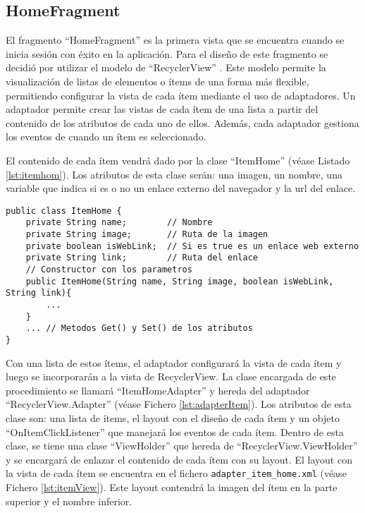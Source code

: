 \subsection{HomeFragment}

El fragmento ``HomeFragment'' es la primera vista que se encuentra cuando se inicia sesión con éxito en la aplicación. Para el diseño de este fragmento se decidió por utilizar el modelo de ``RecyclerView'' \cite{URL::recycler}. Este modelo permite la visualización de listas de elementos o ítems de una forma más flexible, permitiendo configurar la vista de cada ítem mediante el uso de adaptadores. Un adaptador permite crear las vistas de cada ítem de una lista a partir del contenido de los atributos de cada uno de ellos. Además, cada adaptador gestiona los eventos de cuando un ítem es seleccionado.

El contenido de cada ítem vendrá dado por la clase ``ItemHome'' (véase Listado \ref{lst:itemhom}). Los atributos de esta clase serán: una imagen, un nombre, una variable que indica si es o no un enlace externo del navegador y la url del enlace.

\begin{lstlisting}[caption={Fichero \texttt{ItemHome.java}, clase de que contendrá  el contenido de cada ítem de la ventana de \textit{Inicio}.},  label={lst:itemhom}]
public class ItemHome {
    private String name;        // Nombre
    private String image;       // Ruta de la imagen
    private boolean isWebLink;  // Si es true es un enlace web externo
    private String link;        // Ruta del enlace
    // Constructor con los parametros
    public ItemHome(String name, String image, boolean isWebLink, String link){
        ...
    }
    ... // Metodos Get() y Set() de los atributos
}
\end{lstlisting}

Con una lista de estos ítems, el adaptador configurará la vista de cada ítem y luego se incorporarán a la vista de RecyclerView. La clase encargada de este procedimiento se llamará ``ItemHomeAdapter'' y hereda del adaptador ``RecyclerView.Adapter'' (véase Fichero \ref{lst:adapterItem}). Los atributos de esta clase son: una lista de ítems, el layout con el diseño de cada ítem y un objeto ``OnItemClickListener'' que manejará los eventos de cada ítem. Dentro de esta clase, se tiene una clase ``ViewHolder'' que hereda de ``RecyclerView.ViewHolder'' y se encargará de enlazar el contenido de cada ítem con su layout. El layout con la vista de cada ítem se encuentra en el fichero \texttt{adapter\_item\_home.xml} (véase Fichero \ref{lst:itemView}). Este layout contendrá la imagen del ítem en la parte superior y el nombre inferior.
     
